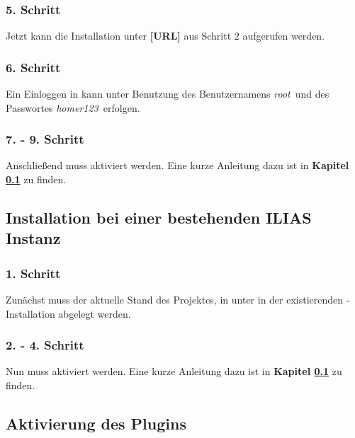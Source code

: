     \subsubsection{5. Schritt}
    
        Jetzt kann die  Installation unter \textbf{[URL]} aus Schritt 2 aufgerufen werden.
    
    \subsubsection{6. Schritt}
    
        Ein Einloggen in  kann unter Benutzung des Benutzernamens \glqq\textit{root}\grqq\ und des Passwortes \glqq\textit{homer123}\grqq\ erfolgen.
    
    \subsubsection{7. - 9. Schritt}

        Anschließend muss  aktiviert werden. Eine kurze Anleitung dazu ist in \textbf{Kapitel \ref{subsec:installation-bestehende-instanz}} zu finden.


\subsection{Installation bei einer bestehenden ILIAS Instanz}
\label{subsec:installation-bestehende-instanz}

    \subsubsection{1. Schritt}
    
        Zunächst muss der aktuelle Stand des Projektes, in unter  in der existierenden -Installation abgelegt werden.
    
    \subsubsection{2. - 4. Schritt}
        
        Nun muss  aktiviert werden. Eine kurze Anleitung dazu ist in \textbf{Kapitel \ref{subsec:installation-bestehende-instanz}} zu finden.


\subsection{Aktivierung des Plugins}
\label{subsec:aktivierung-des-plugins}

